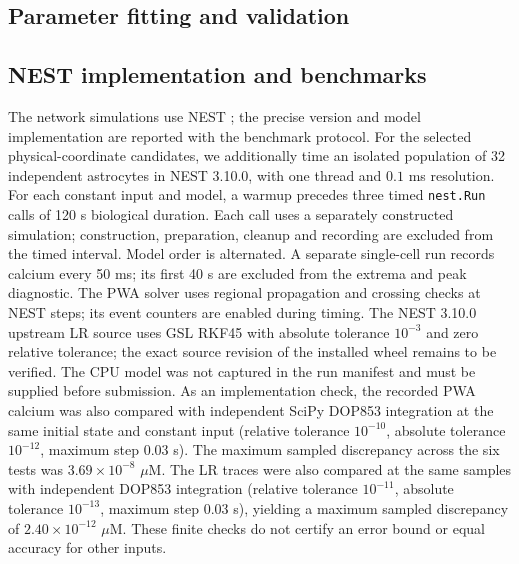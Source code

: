 \documentclass[final,5p,times,twocolumn]{elsarticle}
\begin{document}
\subsection{Parameter fitting and validation}


\subsection{NEST implementation and benchmarks}
The network simulations use NEST \cite{GewaltigDiesmann2007}; the precise
version and model implementation are reported with the benchmark protocol.
For the selected physical-coordinate candidates, we additionally time an
isolated population of 32 independent astrocytes in NEST 3.10.0, with one
thread and $0.1$ ms resolution. For each constant input and model, a warmup
precedes three timed \texttt{nest.Run} calls of 120 s biological duration.
Each call uses a separately constructed simulation; construction, preparation,
cleanup and recording are excluded from the timed interval. Model order is
alternated. A separate single-cell run records calcium every 50 ms; its first
40 s are excluded from the extrema and peak diagnostic.
The PWA solver uses regional propagation and crossing checks at NEST steps;
its event counters are enabled during timing. The NEST 3.10.0 upstream LR
source uses GSL RKF45 with absolute tolerance $10^{-3}$ and zero relative
tolerance; the exact source revision of the installed wheel remains to be
verified. The CPU model was not captured in the run manifest and must be
supplied before submission.
As an implementation check, the recorded PWA calcium was also compared with
independent SciPy DOP853 integration at the same initial state and constant
input (relative tolerance $10^{-10}$, absolute tolerance $10^{-12}$, maximum
step $0.03$ s). The maximum sampled discrepancy across the six tests was
$3.69\times10^{-8}$ $\mu$M. The LR traces were also compared at the same
samples with independent DOP853 integration (relative tolerance $10^{-11}$,
absolute tolerance $10^{-13}$, maximum step $0.03$ s), yielding a maximum
sampled discrepancy of $2.40\times10^{-12}$ $\mu$M. These finite checks do
not certify an error bound or equal accuracy for other inputs.
\end{document}
